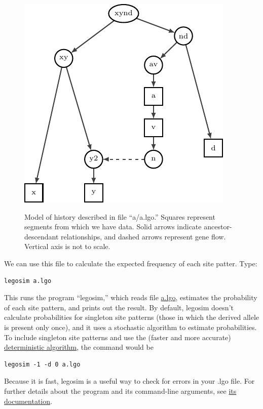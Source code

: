 \documentclass[11pt]{article}
\begin{document}
\begin{figure}
  {\centering\includegraphics{network.pdf}\\}
  \caption{Model of history described in file ``a/a.lgo.'' Squares
    represent segments from which we have data. Solid arrows indicate
    ancestor-descendant relationships, and dashed arrows represent
    gene flow. Vertical axis is not to scale.}
  \label{fig.network}
\end{figure}

We can use this file to calculate the expected frequency of each site
patter. Type:
\begin{verbatim}
legosim a.lgo
\end{verbatim}
This runs the program ``legosim,'' which reads file
\href{https://github.com/alanrogers/agar22/blob/main/legofit/europe/a/a.lgo}{a.lgo},
estimates the probability of each site pattern, and prints out the
result. By default, legosim doesn't calculate probabilities for
singleton site patterns (those in which the derived allele is present
only once), and it uses a stochastic algorithm to estimate
probabilities. To include singleton site patterns and use the (faster
and more accurate)
\href{https://peercommunityjournal.org/articles/10.24072/pcjournal.132}{deterministic
  algorithm}, the command would be
\begin{verbatim}
legosim -1 -d 0 a.lgo
\end{verbatim}
Because it is fast, legosim is a useful way to check for errors in
your .lgo file. For further details about the program and its
command-line arguments, see
\href{http://alanrogers.github.io/legofit/html/legosim.html}{its
  documentation}.
\end{document}
